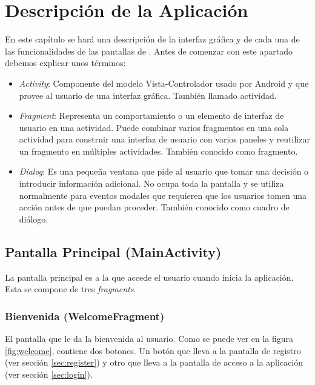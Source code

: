 %
%
%
%

\cleardoublepage
\chapter{Descripción de la Aplicación}
\label{chap:description}

	En este capítulo se hará una descripción de la interfaz gráfica y de cada una de las funcionalidades de las pantallas de \CollegeApp. Antes de comenzar con este apartado debemos explicar unos términos:
	
	\begin{itemize}
		\item {\it Activity}: Componente del modelo Vista-Controlador usado por Android y que provee al usuario de una interfaz gráfica. También llamado actividad.
		\item {\it Fragment}: Representa un comportamiento o un elemento de interfaz de usuario en una actividad. Puede combinar varios fragmentos en una sola actividad para construir una interfaz de usuario con varios paneles y reutilizar un fragmento en múltiples actividades. También conocido como fragmento.
		\item {\it Dialog}: Es una pequeña ventana que pide al usuario que tomar una decisión o introducir información adicional. No ocupa toda la pantalla y se utiliza normalmente para eventos modales que requieren que los usuarios tomen una acción antes de que puedan proceder. También conocido como cuadro de diálogo.
	\end{itemize}
	
	\section{Pantalla Principal (MainActivity)}
		La pantalla principal es a la que accede el usuario cuando inicia la aplicación. Esta se compone de tres {\it fragments}.
		
		\subsection{Bienvenida (WelcomeFragment)} \label{sec:welcome}
			El pantalla que le da la bienvenida al usuario. Como se puede ver en la figura \ref{fig:welcome}, contiene dos botones. Un botón que lleva a la pantalla de registro (ver sección \ref{sec:register}) y otro que lleva a la pantalla de acceso a la aplicación (ver sección \ref{sec:login}).
			
